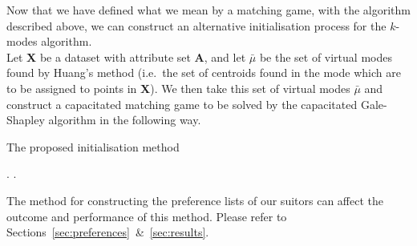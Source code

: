 Now that we have defined what we mean by a matching game, with the algorithm 
described above, we can construct an alternative initialisation process for the 
\(k\)-modes algorithm. \\

Let \textbf{X} be a dataset with attribute set \textbf{A}, and let \(\bar{\mu}\) 
be the set of virtual modes found by Huang's method (i.e.\ the set of centroids 
found in the mode which are to be assigned to points in \textbf{X}). We then 
take this set of virtual modes \(\bar{\mu}\) and construct a capacitated 
matching game to be solved by the capacitated Gale-Shapley algorithm in the 
following way.

\begin{algorithm}[H]
\caption{The proposed initialisation method}
    \begin{algorithmic}[0]
        \EndFor
        \EndFor
        .
            .
        \EndFor
    \end{algorithmic}
\end{algorithm}

\begin{remark}
    The method for constructing the preference lists of our suitors can affect
    the outcome and performance of this method. Please refer to
    Sections~\ref{sec:preferences}~\&~\ref{sec:results}.
\end{remark}
